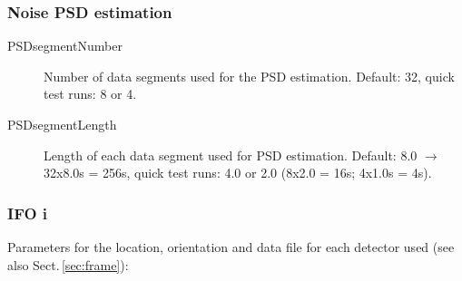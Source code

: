 \subsubsection{Noise PSD estimation}
\begin{description}
\item[PSDsegmentNumber] Number of data segments used for the PSD estimation.  Default: 32, quick test runs: 8 or 4.
\item[PSDsegmentLength] Length of each data segment used for PSD estimation.  Default: 8.0 $\rightarrow$ 32x8.0s = 256s, quick test runs: 4.0 or 2.0 (8x2.0 = 16s; 4x1.0s = 4s).
\end{description}




\subsubsection{IFO i}
\label{sec:input.data.ifo}
Parameters for the location, orientation and data file for each detector used
(see also Sect.\,\ref{sec:frame}):


